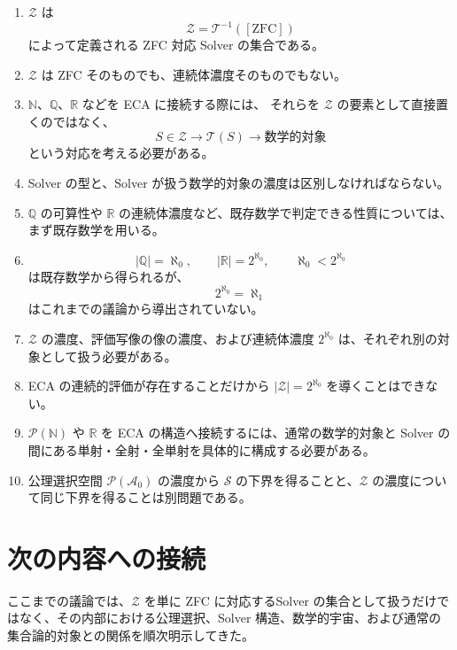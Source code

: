 \documentclass[a4paper,11pt]{article}
\begin{document}
\begin{enumerate}[label=\arabic*.]
    \item
    $\mathcal{Z}$ は
    \[
    \mathcal{Z}
    =
    \mathcal{T}^{-1}\left([\mathrm{ZFC}]\right)
    \]
    によって定義される ZFC 対応 Solver の集合である。

    \item
    $\mathcal{Z}$ は ZFC そのものでも、連続体濃度そのものでもない。

    \item
    $\mathbb{N}$、$\mathbb{Q}$、$\mathbb{R}$ などを ECA に接続する際には、
    それらを $\mathcal{Z}$ の要素として直接置くのではなく、
    \[
    S\in\mathcal{Z}
    \longrightarrow
    \mathcal{T}(S)
    \longrightarrow
    \text{数学的対象}
    \]
    という対応を考える必要がある。

    \item Solver の型と、Solver が扱う数学的対象の濃度は区別しなければならない。
    \item $\mathbb{Q}$ の可算性や $\mathbb{R}$ の連続体濃度など、既存数学で判定できる性質については、まず既存数学を用いる。

    \item
    \[
    |\mathbb{Q}|=\aleph_0,
    \qquad
    |\mathbb{R}|=2^{\aleph_0},
    \qquad
    \aleph_0<2^{\aleph_0}
    \]
    は既存数学から得られるが、
    \[
    2^{\aleph_0}=\aleph_1
    \]
    はこれまでの議論から導出されていない。

    \item
    $\mathcal{Z}$ の濃度、評価写像の像の濃度、および連続体濃度
    $2^{\aleph_0}$ は、それぞれ別の対象として扱う必要がある。

    \item ECA の連続的評価が存在することだけから $|\mathcal{Z}|=2^{\aleph_0}$ を導くことはできない。
    \item $\mathcal{P}(\mathbb{N})$ や $\mathbb{R}$ を ECA の構造へ接続するには、通常の数学的対象と Solver の間にある単射・全射・全単射を具体的に構成する必要がある。
    \item 公理選択空間 $\mathcal{P}(\mathcal{A}_0)$ の濃度から $\mathcal{S}$ の下界を得ることと、$\mathcal{Z}$ の濃度について同じ下界を得ることは別問題である。
\end{enumerate}

\section{次の内容への接続}
ここまでの議論では、$\mathcal{Z}$ を単に ZFC に対応するSolver の集合として扱うだけではなく、その内部における公理選択、Solver 構造、数学的宇宙、および通常の集合論的対象との関係を順次明示してきた。
\end{document}
